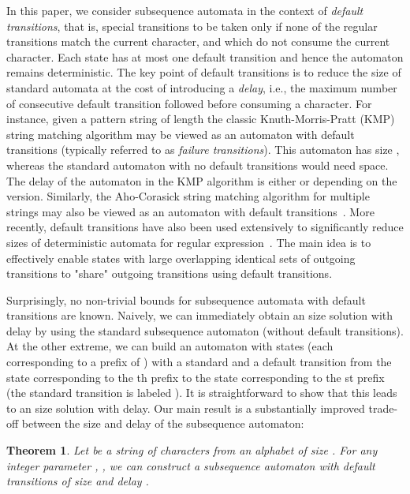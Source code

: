 \documentclass[a4paper,11pt]{article}
\newtheorem{theorem}{Theorem}
\begin{document}
In this paper, we consider subsequence automata in the context of \emph{default transitions}, that is, special transitions to be taken only if none of the regular transitions match the current character, and which do not consume the current character. Each state has at most one default transition and hence the automaton remains deterministic. The key point of default transitions is to reduce the size of standard automata at the cost of introducing a \emph{delay}, i.e., the maximum number of consecutive default transition followed before consuming a character. 
For instance, given a pattern string of length  the classic Knuth-Morris-Pratt (KMP)~\cite{KMP1977} string matching algorithm may be viewed as an automaton with default transitions (typically referred to as \emph{failure transitions}). This automaton has size , whereas the standard automaton with no default transitions would need  space.
The delay of the automaton in the KMP algorithm is either  or  depending on the version. 
Similarly, the Aho-Corasick string matching algorithm for multiple strings may also be viewed as an automaton with default transitions~\cite{AC1975}. More recently, default transitions have also been used extensively to significantly reduce sizes of deterministic automata for regular expression~\cite{kumar2006algorithms,hayes2007dpico}. The main idea is to effectively enable states with large overlapping identical sets of outgoing transitions to "share" outgoing transitions using default transitions. 

Surprisingly, no non-trivial bounds for subsequence automata with default transitions are known. Naively\label{lab:naive-single}, we can immediately obtain an  size solution with  delay by using the standard subsequence automaton (without default transitions). At the other extreme, we can build an automaton with  states (each corresponding to a prefix of ) with a standard and a default transition from the state corresponding to the th prefix to the state corresponding to the st prefix (the standard transition is labeled ). It is straightforward to show that this leads to an  size solution with  delay. Our main result is a substantially improved trade-off between the size and delay of the subsequence automaton:

\begin{theorem}
\label{thm:main}
Let  be a string of  characters from an alphabet of size . For any integer parameter , , we can construct a subsequence automaton with default transitions of size  and delay .
\end{theorem}
\end{document}
